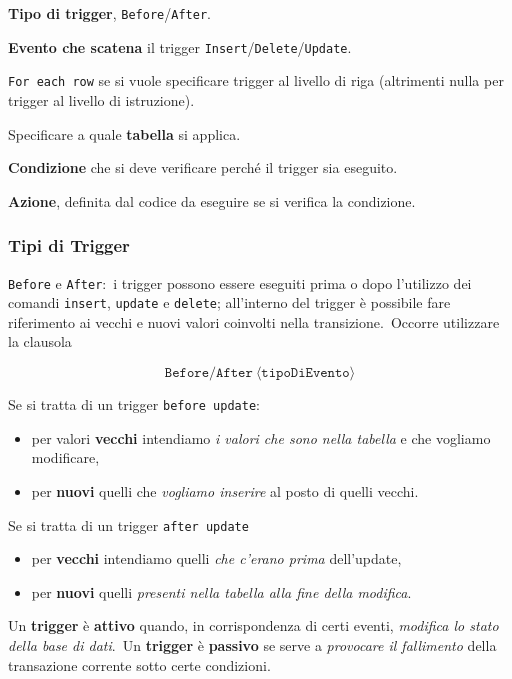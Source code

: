 \noindent \textbf{Tipo di trigger}, \texttt{Before}/\texttt{After}.\

\noindent\textbf{Evento che scatena} il trigger \texttt{Insert}/\texttt{Delete}/\texttt{Update}.\

\noindent \texttt{For each row} se si vuole specificare trigger al livello di riga (altrimenti nulla per trigger al livello di istruzione).\

\noindent Specificare a quale \textbf{tabella} si applica.\

\noindent\textbf{Condizione} che si deve verificare perché il trigger sia eseguito.\

\noindent\textbf{Azione}, definita dal codice da eseguire se si verifica la condizione.

\subsubsection{Tipi di Trigger}

\texttt{Before} e \texttt{After}:\ i trigger possono essere eseguiti prima o dopo l'utilizzo dei comandi \texttt{insert}, \texttt{update} e \texttt{delete}; all'interno del trigger è possibile fare riferimento ai vecchi e nuovi valori coinvolti nella transizione.\
Occorre utilizzare la clausola
\begin{center}
	\[\mathtt{Before/After\ \langle tipoDiEvento\rangle}\]
\end{center}

\noindent Se si tratta di un trigger \texttt{before update}:
\begin{itemize}
	\item per valori \textbf{vecchi} intendiamo \textit{i valori che sono nella tabella} e che vogliamo modificare,
	\item per \textbf{nuovi} quelli che \textit{vogliamo inserire} al posto di quelli vecchi.
\end{itemize}

\noindent Se si tratta di un trigger \texttt{after update}

\begin{itemize}
	\item per \textbf{vecchi} intendiamo quelli \textit{che c'erano prima} dell'update,
	\item per \textbf{nuovi} quelli \textit{presenti nella tabella alla fine della modifica}.
\end{itemize}

\noindent Un \textbf{trigger} è \textbf{attivo} quando, in corrispondenza di certi eventi, \textit{modifica lo stato della base di dati}.\
Un \textbf{trigger} è \textbf{passivo} se serve a \textit{provocare il fallimento} della transazione corrente sotto certe condizioni.

